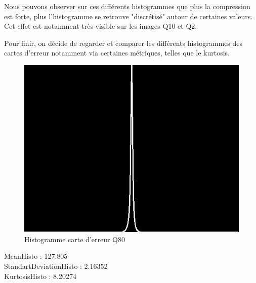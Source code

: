\documentclass[12pt]{report}
\begin{document}
Nous pouvons observer sur ces différents histogrammes que plus la compression est forte, plus l'histogramme se retrouve "discrétisé" autour de certaines valeurs. Cet effet est notamment très visible sur les images Q10 et Q2.

Pour finir, on décide de regarder et comparer les différents histogrammes des cartes d'erreur notamment via certaines métriques, telles que le kurtosis.

\begin{figure}[H]
\begin{center}
\includegraphics[scale=0.5]{../ImageRes/hist_disto_1.jpg} 
\caption{Histogramme carte d'erreur Q80 }
\end{center}
\end{figure}

\begin{center}
MeanHisto : 127.805\\
StandartDeviationHisto : 2.16352\\
KurtosisHisto : 8.20274
\end{center}
\end{document}
